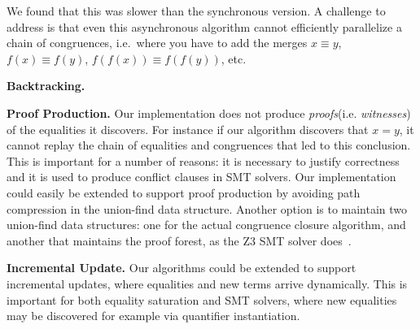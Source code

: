 We found that this was slower than the synchronous version. A challenge to
address is that even this asynchronous algorithm cannot efficiently
parallelize a chain of congruences, i.e.\ where you have to add the merges
$x \equiv y$, $f(x) \equiv f(y)$, $f(f(x)) \equiv f(f(y))$, etc.




\textbf{Backtracking.} 

\textbf{Proof Production.} Our implementation does not produce \emph{proofs}(i.e.
\emph{witnesses}) of the equalities it discovers. For instance if our algorithm
discovers that $x = y$, it cannot replay the chain of equalities and congruences
that led to this conclusion. This is important for a number of reasons: it is
necessary to justify correctness and it is used to produce conflict clauses in
SMT solvers. Our implementation could easily be extended to support proof
production by avoiding path compression in the union-find data structure.
Another option is to maintain two union-find data structures: one for the
actual congruence closure algorithm, and another that maintains the proof
forest, as the Z3 SMT solver does~\cite{z3-internals}.

\textbf{Incremental Update.} Our algorithms could be extended to support
incremental updates, where equalities and new terms arrive dynamically. This
is important for both equality saturation and SMT solvers, where new
equalities may be discovered for example via quantifier instantiation.
